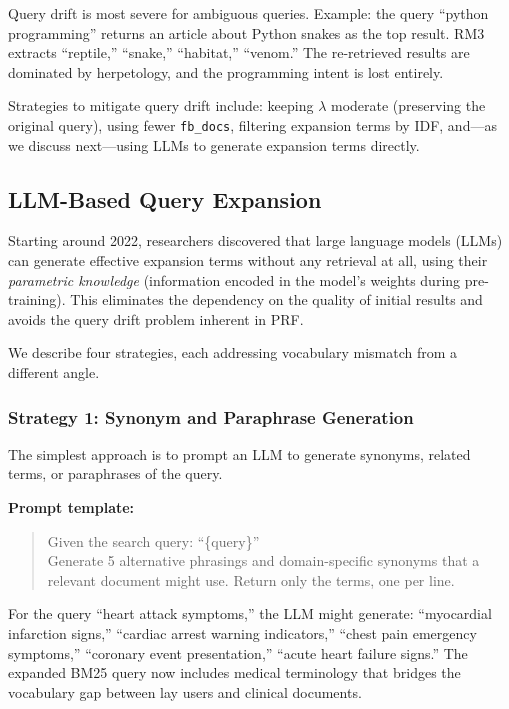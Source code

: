 \documentclass[11pt,a4paper]{article}
\theoremstyle{definition}
\theoremstyle{plain}
\begin{document}
\begin{pitfall}
Query drift is most severe for ambiguous queries. Example: the query ``python programming'' returns an article about Python snakes as the top result. RM3 extracts ``reptile,'' ``snake,'' ``habitat,'' ``venom.'' The re-retrieved results are dominated by herpetology, and the programming intent is lost entirely.
\end{pitfall}

Strategies to mitigate query drift include: keeping $\lambda$ moderate (preserving the original query), using fewer \texttt{fb\_docs}, filtering expansion terms by IDF, and---as we discuss next---using LLMs to generate expansion terms directly.

\subsection{LLM-Based Query Expansion}
\label{sec:llmqe}

Starting around 2022, researchers discovered that large language models (LLMs) can generate effective expansion terms without any retrieval at all, using their \emph{parametric knowledge} (information encoded in the model's weights during pre-training). This eliminates the dependency on the quality of initial results and avoids the query drift problem inherent in PRF.

We describe four strategies, each addressing vocabulary mismatch from a different angle.

\subsubsection{Strategy 1: Synonym and Paraphrase Generation}

The simplest approach is to prompt an LLM to generate synonyms, related terms, or paraphrases of the query.

\textbf{Prompt template:}
\begin{quote}
\ttfamily Given the search query: ``\{query\}''\\
Generate 5 alternative phrasings and domain-specific synonyms that a relevant document might use. Return only the terms, one per line.
\end{quote}

For the query ``heart attack symptoms,'' the LLM might generate: ``myocardial infarction signs,'' ``cardiac arrest warning indicators,'' ``chest pain emergency symptoms,'' ``coronary event presentation,'' ``acute heart failure signs.'' The expanded BM25 query now includes medical terminology that bridges the vocabulary gap between lay users and clinical documents.
\end{document}
